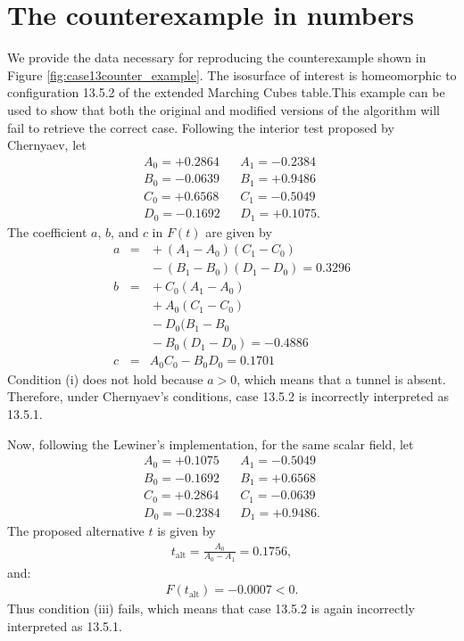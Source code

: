 \chapter{The counterexample in numbers}
\label{app:counter-example}

We provide the data necessary for reproducing the counterexample shown in Figure \ref{fig:case13counter_example}. The isosurface of interest is homeomorphic to configuration 13.5.2 of the extended Marching Cubes table.This example can be used to show that both the original and modified versions of the \mc{} algorithm will fail to retrieve the correct case. 
Following the interior test proposed by Chernyaev, let
\begin{eqnarray}
A_0 = +0.2864 & &A_1 = -0.2384 \nonumber\\
 B_0 = -0.0639 & &B_1 =  +0.9486 \nonumber\\
C_0 =+0.6568 & &C_1 = -0.5049\nonumber\\
D_0  = -0.1692 & &D_1 = +0.1075.\nonumber
\end{eqnarray}
The coefficient $a$, $b$, and $c$ in $F(t)$ are given by
\begin{eqnarray*}
a &=& {}+(A_1-A_0)(C_1-C_0)\\
& & {} -(B_1-B_0)(D_1-D_0) = 0.3296\\
b &=& {}+C_0(A_1-A_0)\\ 
& & {}+ A_0(C_1-C_0)\\
& & {}-D_0(B_1-B_0\\
& & {}-B_0(D_1-D_0) = -0.4886\\
c &=& {} A_0C_0 - B_0D_0 = 0.1701
\end{eqnarray*}
Condition (i) does not hold because $a > 0$, which means that a tunnel is absent. Therefore, under Chernyaev's conditions, case 13.5.2 is incorrectly interpreted as 13.5.1. 

Now, following the Lewiner's implementation, for the same scalar field, let
\begin{eqnarray}
A_0 = +0.1075    & &A_1 =  -0.5049\nonumber\\
B_0 = -0.1692     & &B_1 =  +0.6568 \nonumber\\
C_0 = +0.2864   & &C_1 =  -0.0639\nonumber\\
D_0  = -0.2384 & &D_1 =  +0.9486.\nonumber
\end{eqnarray}
%
The proposed alternative $t$ is given by
\begin{eqnarray}
t_{\mathrm{alt}} = \frac{A_0}{A_0 - A_1}= 0.1756 ,\nonumber
\end{eqnarray}
and:
\begin{eqnarray}
F(t_{\mathrm{alt}}) = -0.0007 < 0.\nonumber
\end{eqnarray}
Thus condition (iii) fails, which means that case 13.5.2 is again incorrectly interpreted as 13.5.1.
